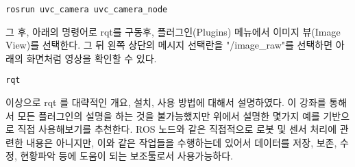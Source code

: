 \begin{lstlisting}[language=ros]
rosrun uvc_camera uvc_camera_node
\end{lstlisting}

그 후, 아래의 명령어로 rqt를 구동후, 플러그인(Plugins) 메뉴에서 이미지 뷰(Image View)를 선택한다. 그 뒤 왼쪽 상단의 메시지 선택란을 "/image\_raw"를 선택하면 아래의 화면처럼 영상을 확인할 수 있다. 

\begin{lstlisting}[language=ros]
rqt
\end{lstlisting}

이상으로 rqt 를 대략적인 개요, 설치, 사용 방법에 대해서 설명하였다. 이 강좌를 통해서 모든 플러그인의 설명을 하는 것을 불가능했지만 위에서 설명한 몇가지 예를 기반으로 직접 사용해보기를 추천한다. ROS 노드와 같은 직접적으로 로봇 및 센서 처리에 관련한 내용은 아니지만, 이와 같은 작업들을 수행하는데 있어서 데이터를 저장, 보존, 수정, 현황파악 등에 도움이 되는 보조툴로서 사용가능하다. 













